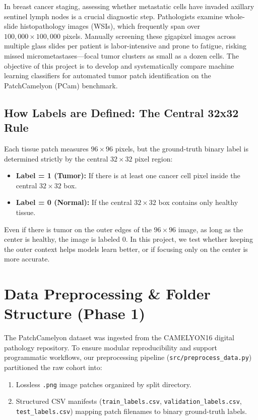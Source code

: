 \documentclass[11pt,a4paper]{article}
\begin{document}
In breast cancer staging, assessing whether metastatic cells have invaded axillary sentinel lymph nodes is a crucial diagnostic step. Pathologists examine whole-slide histopathology images (WSIs), which frequently span over $100,000 \times 100,000$ pixels. Manually screening these gigapixel images across multiple glass slides per patient is labor-intensive and prone to fatigue, risking missed micrometastases---focal tumor clusters as small as a dozen cells. The objective of this project is to develop and systematically compare machine learning classifiers for automated tumor patch identification on the PatchCamelyon (PCam) benchmark.

\subsection{How Labels are Defined: The Central 32x32 Rule}
Each tissue patch measures $96 \times 96$ pixels, but the ground-truth binary label is determined strictly by the central $32 \times 32$ pixel region:
\begin{itemize}[noitemsep]
    \item \textbf{Label = 1 (Tumor):} If there is at least one cancer cell pixel inside the central $32 \times 32$ box.
    \item \textbf{Label = 0 (Normal):} If the central $32 \times 32$ box contains only healthy tissue.
\end{itemize}

Even if there is tumor on the outer edges of the $96 \times 96$ image, as long as the center is healthy, the image is labeled 0. In this project, we test whether keeping the outer context helps models learn better, or if focusing only on the center is more accurate.

\section{Data Preprocessing \& Folder Structure (Phase 1)}

The PatchCamelyon dataset was ingested from the CAMELYON16 digital pathology repository. To ensure modular reproducibility and support programmatic workflows, our preprocessing pipeline (\texttt{src/preprocess\_data.py}) partitioned the raw cohort into:
\begin{enumerate}[noitemsep]
    \item Lossless \texttt{.png} image patches organized by split directory.
    \item Structured CSV manifests (\texttt{train\_labels.csv}, \texttt{validation\_labels.csv}, \texttt{test\_labels.csv}) mapping patch filenames to binary ground-truth labels.
\end{enumerate}
\end{document}
